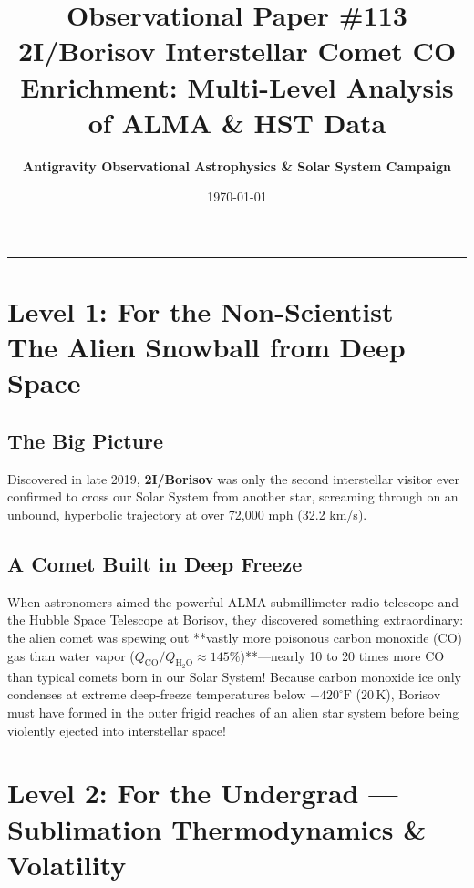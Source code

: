 \documentclass[11pt,a4paper]{article}
\title{\Huge \textbf{Observational Paper \#113}\\ \Large 2I/Borisov Interstellar Comet CO Enrichment: Multi-Level Analysis of ALMA \& HST Data}
\author{\textbf{Antigravity Observational Astrophysics \& Solar System Campaign}}
\date{\today}
\begin{document}
\maketitle

\vspace{-1em}
\begin{center}
\rule{\textwidth}{1.5pt}
\end{center}

\section*{Level 1: For the Non-Scientist — The Alien Snowball from Deep Space}

\subsection*{The Big Picture}
Discovered in late 2019, \textbf{2I/Borisov} was only the second interstellar visitor ever confirmed to cross our Solar System from another star, screaming through on an unbound, hyperbolic trajectory at over 72,000 mph (32.2 km/s).

\subsection*{A Comet Built in Deep Freeze}
When astronomers aimed the powerful ALMA submillimeter radio telescope and the Hubble Space Telescope at Borisov, they discovered something extraordinary: the alien comet was spewing out **vastly more poisonous carbon monoxide (CO) gas than water vapor ($Q_{\text{CO}} / Q_{\text{H}_2\text{O}} \approx 145\%$)**—nearly 10 to 20 times more CO than typical comets born in our Solar System! Because carbon monoxide ice only condenses at extreme deep-freeze temperatures below $-420^\circ\text{F}$ ($20\,\text{K}$), Borisov must have formed in the outer frigid reaches of an alien star system before being violently ejected into interstellar space!

\newpage

\section*{Level 2: For the Undergrad — Sublimation Thermodynamics \& Volatility}
\end{document}
